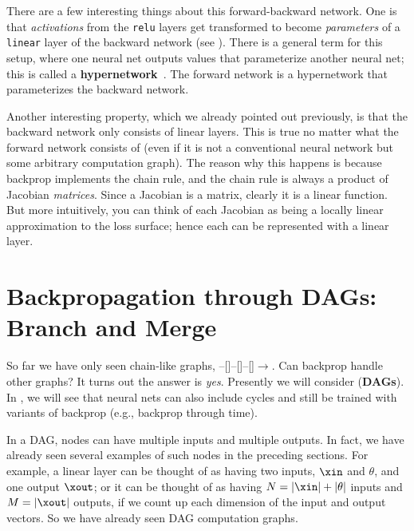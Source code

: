 There are a few interesting things about this forward-backward network. One is that \textit{activations} from the \texttt{relu} layers get transformed to become \textit{parameters} of a \texttt{linear} layer of the backward network (see \eqn{\ref{eqn:backpropagation:pointwise_costgrad}}). There is a general term for this setup, where one neural net outputs values that parameterize another neural net; this is called a \textbf{hypernetwork}~\cite{ha2016hypernetworks}. The forward network is a hypernetwork that parameterizes the backward network.

Another interesting property, which we already pointed out previously, is that the backward network only consists of linear layers. This is true no matter what the forward network consists of (even if it is not a conventional neural network but some arbitrary computation graph). The reason why this happens is because backprop implements the chain rule, and the chain rule is always a product of Jacobian \textit{matrices}. Since a Jacobian is a matrix, clearly it is a linear function. But more intuitively, you can think of each Jacobian as being a locally linear approximation to the loss surface; hence each can be represented with a linear layer.


\section{Backpropagation through DAGs: Branch and Merge}\label{sec:backpropagation:branch_and_merge}

So far we have only seen chain-like graphs, --[]--[]--[]$\rightarrow$. Can backprop handle other graphs? It turns out the answer is \textit{yes}. Presently we will consider  ({\bf DAGs}). In \chap{\ref{chapter:recurrent_neural_nets}}, we will see that neural nets can also include cycles and still be trained with variants of backprop (e.g., backprop through time).

In a DAG, nodes can have multiple inputs and multiple outputs. In fact, we have already seen several examples of such nodes in the preceding sections. For example, a linear layer can be thought of as having two inputs, $\xin$ and $\theta$, and one output $\xout$; or it can be thought of as having $N = |\xin| + |\theta|$ inputs and $M = |\xout|$ outputs, if we count up each dimension of the input and output vectors. So we have already seen DAG computation graphs.

